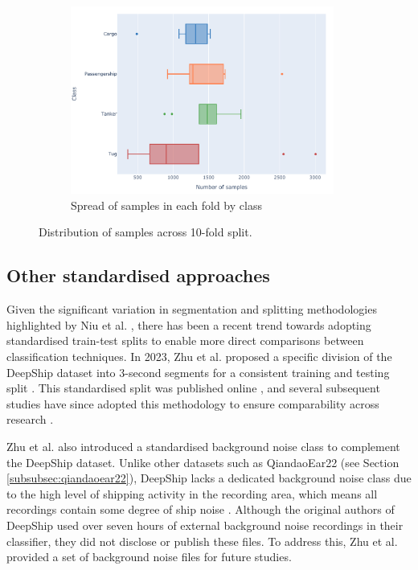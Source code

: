 \begin{figure}
    \ContinuedFloat
    \begin{subfigure}[t]{\textwidth}
        \centering
        \includegraphics[width=0.95\textwidth]{img/ch3/10_fold_spread.pdf}
        \caption{Spread of samples in each fold by class}
        \label{fig:10-fold-spread}
    \end{subfigure}
    \caption{Distribution of samples across 10-fold split.}
    \label{fig:10-fold-overview}
\end{figure}

\subsection{Other standardised approaches}

Given the significant variation in segmentation and splitting methodologies highlighted by Niu et al. \cite{niu_advances_2023}, there has been a recent trend towards adopting standardised train-test splits to enable more direct comparisons between classification techniques. In 2023, Zhu et al. proposed a specific division of the DeepShip dataset into 3-second segments for a consistent training and testing split \cite{zhu_underwater_2023}. This standardised split was published online \cite{zhupengsen_zhupengsenmethod-for-splitting--deepship-dataset_2024}, and several subsequent studies have since adopted this methodology to ensure comparability across research \cite{xu_self-supervised_2023, xu_self-supervised_2024, zhu_sfc-sup_2023, lin_underwater_2024}.

Zhu et al. also introduced a standardised background noise class to complement the DeepShip dataset. Unlike other datasets such as QiandaoEar22 (see Section \ref{subsubsec:qiandaoear22}), DeepShip lacks a dedicated background noise class due to the high level of shipping activity in the recording area, which means all recordings contain some degree of ship noise \cite{irfan_deepship_2021}. Although the original authors of DeepShip used over seven hours of external background noise recordings in their classifier, they did not disclose or publish these files. To address this, Zhu et al. provided a set of background noise files for future studies.

